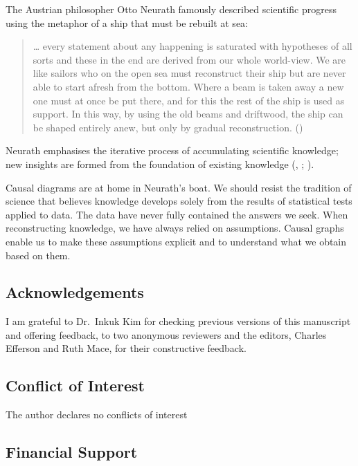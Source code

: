 \documentclass[
  single column]{article}
\begin{document}
The Austrian philosopher Otto Neurath famously described scientific
progress using the metaphor of a ship that must be rebuilt at sea:

\begin{quote}
\ldots{} every statement about any happening is saturated with
hypotheses of all sorts and these in the end are derived from our whole
world-view. We are like sailors who on the open sea must reconstruct
their ship but are never able to start afresh from the bottom. Where a
beam is taken away a new one must at once be put there, and for this the
rest of the ship is used as support. In this way, by using the old beams
and driftwood, the ship can be shaped entirely anew, but only by gradual
reconstruction. ()
\end{quote}

Neurath emphasises the iterative process of accumulating scientific
knowledge; new insights are formed from the foundation of existing
knowledge (,
;
).

Causal diagrams are at home in Neurath's boat. We should resist the
tradition of science that believes knowledge develops solely from the
results of statistical tests applied to data. The data have never fully
contained the answers we seek. When reconstructing knowledge, we have
always relied on assumptions. Causal graphs enable us to make these
assumptions explicit and to understand what we obtain based on them.

\newpage{}

\subsection{Acknowledgements}\label{acknowledgements}

I am grateful to Dr.~Inkuk Kim for checking previous versions of this
manuscript and offering feedback, to two anonymous reviewers and the
editors, Charles Efferson and Ruth Mace, for their constructive
feedback.

\subsection{Conflict of Interest}\label{conflict-of-interest}

The author declares no conflicts of interest

\subsection{Financial Support}\label{financial-support}
\end{document}
